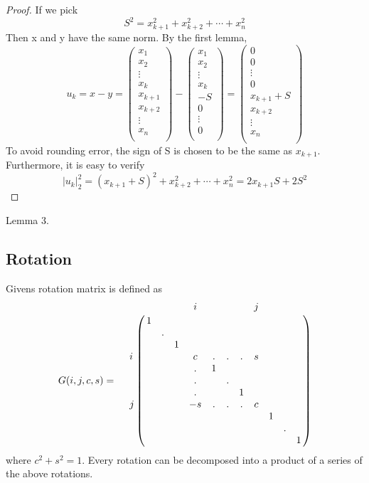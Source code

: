 \begin{proof}
If we pick 
\[S^2 = x_{k+1}^2 + x_{k+2}^2 + \cdots + x_{n}^2\]
Then x and y have the same norm. By the first lemma, 
\[u_k = x - y =
\left( \begin{array}{c} x_1\\ x_2\\ \vdots\\ x_k\\ x_{k+1}\\ x_{k+2}\\ \vdots\\ x_n\\ \end{array} \right) -
\left( \begin{array}{c} x_1\\ x_2\\ \vdots\\ x_k\\ -S\\ 0\\ \vdots\\ 0\\ \end{array} \right) =
\left( \begin{array}{c} 0\\ 0\\ \vdots\\ 0\\  x_{k+1}+S\\ x_{k+2}\\ \vdots\\ x_n\\ \end{array} \right)
\]
To avoid rounding error, the sign of S is chosen to be the same as $x_{k+1}$. Furthermore, it is easy to verify
\[ {\bigl|u_k\bigr|}_2^2 = (x_{k+1} + S)^2 + x_{k+2}^2 + \cdots + x_{n}^2
=2x_{k+1}S + 2S^2\]
\end{proof}

Lemma 3.

\subsection{Rotation}
Givens rotation matrix is defined as
\[G(i, j, c, s) = \ \ \ \bordermatrix{
    & & & & i & & & & j\cr
    & 1 \cr
    & & . \cr
    & & & 1 \cr
  i & & & & c & . & . & . & s \cr
    & & & & . & 1 \cr
    & & & & . & & . \cr
    & & & & . & & & 1 \cr
  j & & & & -s & . & . & . & c \cr
    & & & & & & & & & 1 \cr
    & & & & & & & & & & .\cr
    & & & & & & & & & & & 1\cr
}
\]
where $c^2 + s^2 = 1$. Every rotation can be decomposed into a product of a series of the above rotations.

